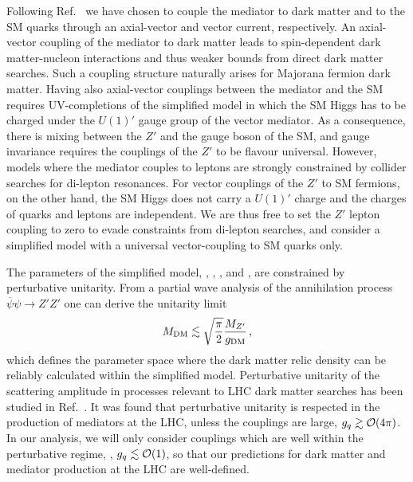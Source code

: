 \documentclass[floatfix]{article}
\begin{document}
Following Ref.~\cite{Kahlhoefer:2015bea} we have chosen to couple the mediator to 
dark matter and to the SM quarks through an axial-vector and vector current, respectively. An axial-vector coupling of the 
mediator to dark matter leads to spin-dependent dark matter-nucleon interactions and thus weaker bounds from direct dark matter searches. 
Such a coupling structure naturally arises for Majorana fermion dark matter. Having also axial-vector couplings between
the mediator and the SM  requires UV-completions of the simplified model in which the SM Higgs has to be charged under 
the $U(1)'$ gauge group of the vector mediator. As a consequence, there is mixing between the $Z'$ and the gauge boson of the SM, and gauge invariance 
requires the couplings of the $Z'$ to be flavour universal. However, models where the mediator couples to leptons 
are strongly constrained by collider searches for di-lepton resonances. For vector couplings of the $Z'$ to  SM fermions, on the other hand, 
the SM Higgs does not carry a $U(1)'$ charge and the charges of quarks and leptons are independent. We are thus free to set the 
$Z'$ lepton coupling to zero to evade constraints from di-lepton searches, and consider a simplified model with a universal vector-coupling 
to SM quarks only. 

The parameters of the simplified model, \GDM, \GQ, \MDM, and \MZP, are constrained by perturbative unitarity. 
From a partial wave analysis of the annihilation process $\overline{\psi}\psi \to Z' Z'$ one can derive the unitarity limit~\cite{Kahlhoefer:2015bea}
\begin{equation}
M_{\rm DM} \lesssim \sqrt{\frac{\pi}{2}} \frac{M_{Z^{\prime}}}{g_{\rm DM}}\,,
\end{equation}
which defines the parameter space where the dark matter relic density can be reliably calculated within the simplified model. 
Perturbative unitarity of the scattering amplitude in processes relevant to LHC dark matter searches has been studied in Ref.~\cite{Englert:2016joy}. 
It was found that perturbative unitarity is respected in the production of mediators at the LHC, unless 
the couplings are large, $g_{q} \gtrsim {\cal O}(4\pi)$. In our analysis, we will only consider couplings which are well within the 
perturbative regime, \GDM, $g_{q} \lesssim {\cal O}(1)$, so that our predictions for dark matter and mediator production at the LHC 
are well-defined. 
\end{document}

